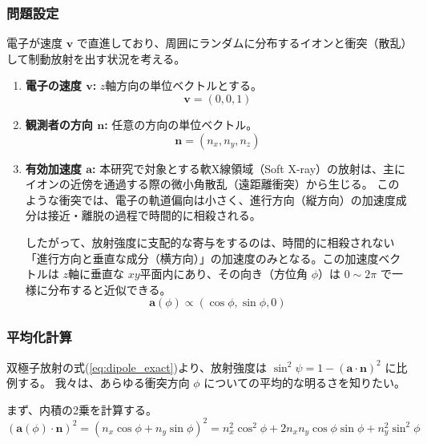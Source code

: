 \documentclass[a4paper,11pt]{bxjsarticle} %
\begin{document}

\subsubsection{問題設定}
電子が速度 $\bm{v}$ で直進しており、周囲にランダムに分布するイオンと衝突（散乱）して制動放射を出す状況を考える。

\begin{enumerate}
    \item \textbf{電子の速度 $\bm{v}$:} $z$軸方向の単位ベクトルとする。
    \begin{equation}
        \bm{v} = (0, 0, 1)
    \end{equation}
    
    \item \textbf{観測者の方向 $\bm{n}$:} 任意の方向の単位ベクトル。
    \begin{equation}
        \bm{n} = (n_x, n_y, n_z)
    \end{equation}
    
    \item \textbf{有効加速度 $\bm{a}$:} 
    本研究で対象とする軟X線領域（Soft X-ray）の放射は、主にイオンの近傍を通過する際の微小角散乱（遠距離衝突）から生じる。
    このような衝突では、電子の軌道偏向は小さく、進行方向（縦方向）の加速度成分は接近・離脱の過程で時間的に相殺される。
    
    したがって、放射強度に支配的な寄与をするのは、時間的に相殺されない「進行方向と垂直な成分（横方向）」の加速度のみとなる。この加速度ベクトルは $z$軸に垂直な $xy$平面内にあり、その向き（方位角 $\phi$）は $0 \sim 2\pi$ で一様に分布すると近似できる。
    \begin{equation}
        \bm{a}(\phi) \propto (\cos\phi, \sin\phi, 0)
    \end{equation}
\end{enumerate}

\subsubsection{平均化計算}
双極子放射の式(\ref{eq:dipole_exact})より、放射強度は $\sin^2\psi = 1 - (\bm{a} \cdot \bm{n})^2$ に比例する。
我々は、あらゆる衝突方向 $\phi$ についての平均的な明るさを知りたい。

まず、内積の2乗を計算する。
\begin{equation}
    (\bm{a}(\phi) \cdot \bm{n})^2 = (n_x \cos\phi + n_y \sin\phi)^2 = n_x^2 \cos^2\phi + 2n_x n_y \cos\phi \sin\phi + n_y^2 \sin^2\phi
\end{equation}
\end{document}
